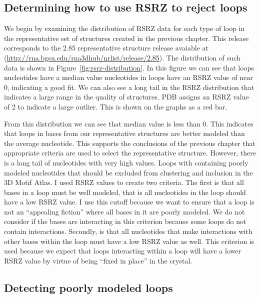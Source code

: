 \subsection{Determining how to use RSRZ to reject loops}

We begin by examining the distribution of RSRZ data for each type of loop in the
representative set of structures created in the previous chapter. This release
corresponds to the 2.85 representative structure release avaiable at
(\url{http://rna.bgsu.edu/rna3dhub/nrlist/release/2.85}). The distribution of
such data is shown in Figure~\ref{fig:rsrz-distribution}. In this figure we can
see that loops nucleotides have a median value nucleotides in loops have an RSRZ
value of near 0, indicating a good fit. We can also see a long tail in the RSRZ
distribution that indicates a large range in the quality of structures. PDB
assigns an RSRZ value of 2 to indicate a large outlier. This is shown on the
graphs as a red bar.

\begin{figure}
  \label{fig:rsrz-distrubution}
\end{figure}

From this distribution we can see that median value is less than 0. This
indicates that loops in bases from our representative structures are better
modeled than the average nucleotide. This supports the conclusions of the
previous chapter that appropriate criteria are used to select the representative
structure. However, there is a long tail of nucleotides with very high values.
Loops with containing poorly modeled nucleotides that should be excluded from
clustering and inclusion in the 3D Motif Atlas. I used RSRZ values to create two
criteria. The first is that all bases in a loop must be well modeled, that is
all nucleotides in the loop should have a low RSRZ value. I use this cutoff
because we want to ensure that a loop is not an ``appealing fiction'' where all
bases in it are poorly modeled. We do not consider if the bases are interacting
in this criterion because some loops do not contain interactions. Secondly, is
that all nucleotides that make interactions with other bases within the loop
must have a low RSRZ value as well. This criterion is used because we expect
that loops interacting within a loop will have a lower RSRZ value by virtue of
being ``fixed in place'' in the crystal.

\subsection{Detecting poorly modeled loops}

